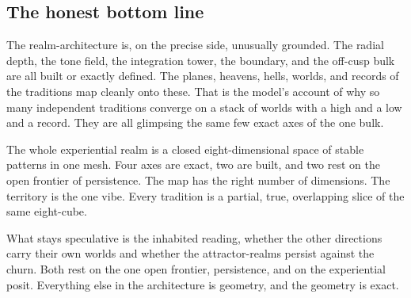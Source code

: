 \subsection{The honest bottom line}

The realm-architecture is, on the precise side, unusually grounded. The
radial depth, the tone field, the integration tower, the boundary, and the
off-cusp bulk are all built or exactly defined. The planes, heavens, hells,
worlds, and records of the traditions map cleanly onto these. That is the
model's account of why so many independent traditions converge on a stack
of worlds with a high and a low and a record. They are all glimpsing the
same few exact axes of the one bulk.

\begin{principle}
The whole experiential realm is a closed eight-dimensional space of stable
patterns in one mesh. Four axes are exact, two are built, and two rest on
the open frontier of persistence. The map has the right number of
dimensions. The territory is the one vibe. Every tradition is a partial,
true, overlapping slice of the same eight-cube.
\end{principle}

What stays speculative is the inhabited reading, whether the other
directions carry their own worlds and whether the attractor-realms persist
against the churn. Both rest on the one open frontier, persistence, and on
the experiential posit. Everything else in the architecture is geometry,
and the geometry is exact.
